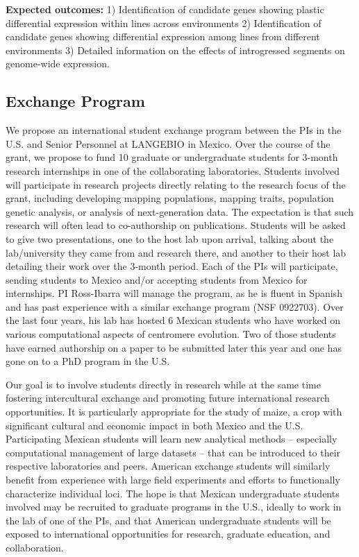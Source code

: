 {\bf Expected outcomes:} 1) Identification of candidate genes showing plastic differential expression within lines across environments 2) Identification of candidate genes showing differential expression among lines from different environments 3) Detailed information on the effects of introgressed segments on genome-wide expression. 


\subsection*{Exchange Program} 

We propose an international student exchange program between the PIs in the U.S. and Senior Personnel at LANGEBIO in Mexico. Over the course of the grant, we propose to fund 10 graduate or undergraduate students for 3-month research internships in one of the collaborating laboratories. Students involved will participate in research projects directly relating to the research focus of the grant, including developing mapping populations, mapping traits, population genetic analysis, or analysis of next-generation data. The expectation is that such research will often lead to co-authorship on publications. Students will be asked to give two presentations, one to the host lab upon arrival, talking about the lab/university they came from and research there, and another to their host lab detailing their work over the 3-month period.  Each of the PIs will participate, sending students to Mexico and/or accepting students from Mexico for internships. PI Ross-Ibarra will manage the program, as he is fluent in Spanish and has past experience with a similar exchange program (NSF 0922703). Over the last four years, his lab has hosted 6 Mexican students who have worked on various computational aspects of centromere evolution. Two of those students have earned authorship on a paper to be submitted later this year and one has gone on to a PhD program in the U.S.

Our goal is to involve students directly in research while at the same time fostering intercultural exchange and promoting future international research opportunities. It is particularly appropriate for the study of maize, a crop with significant cultural and economic impact in both Mexico and the U.S. Participating Mexican students will learn new analytical methods -- especially computational management of large datasets -- that can be introduced to their respective laboratories and peers. American exchange students will similarly benefit from experience with large field experiments and efforts to functionally characterize individual loci.  The hope is that Mexican undergraduate students involved may be recruited to graduate programs in the U.S., ideally to work in the lab of one of the PIs, and that American undergraduate students will be exposed to international opportunities for research, graduate education, and collaboration.

